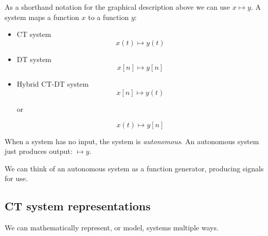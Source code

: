 As a shorthand notation for the graphical description above we can use $x \mapsto y$. A system maps  a function $x$ to a function $y$:

\begin{itemize}
\item CT system
  \[
  x(t) \mapsto y(t)
  \]
  
\item DT system
  \[
  x[n] \mapsto y[n]
  \]
\item Hybrid CT-DT system
  \[
  x[n] \mapsto y(t)
  \]
  \begin{center}
    or
  \end{center}
  \[
  x(t) \mapsto y[n]
  \]
\end{itemize}

When a system has no input, the system is {\it autonomous}. An autonomous system just produces output: $\mapsto y$.

\begin{center}
\end{center}

We can think of an autonomous system as a function generator, producing signals for use.

\subsection{CT system representations}

We can mathematically represent, or model, systems multiple ways.

